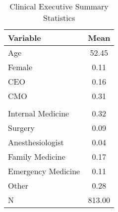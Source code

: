 \begin{table}[ht!]
\centering
\caption{\label{doc_sumstats}Clinical Executive Summary Statistics}
\centering
\begin{tabular}[t]{lc}
\toprule
Variable & Mean\\
\midrule
Age & 52.45\\
Female & 0.11\\
CEO & 0.16\\
CMO & 0.31\\
\addlinespace[0.3em]
\multicolumn{2}{l}{\textbf{Specialty}}\\
\hspace{1em}Internal Medicine & 0.32\\
\hspace{1em}Surgery & 0.09\\
\hspace{1em}Anesthesiologist & 0.04\\
\hspace{1em}Family Medicine & 0.17\\
\hspace{1em}Emergency Medicine & 0.11\\
\hspace{1em}Other & 0.28\\
N & 813.00\\
\bottomrule
\end{tabular}
\end{table}
